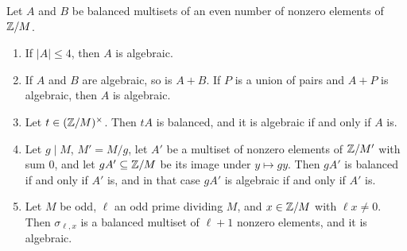 \begin{lemma}\label{lem:algtools}
Let $A$ and $B$ be balanced multisets of an even number of nonzero elements
of $\mathbb{Z}/M$.
\begin{enumerate}[label=\textup{(\alph*)}]
\item If $|A|\le4$, then $A$ is algebraic.
\item If $A$ and $B$ are algebraic, so is $A+B$. If $P$ is a union of pairs
and $A+P$ is algebraic, then $A$ is algebraic.
\item Let $t\in(\mathbb{Z}/M)^{\times}$. Then $tA$ is balanced, and it is algebraic
if and only if $A$ is.
\item Let $g\mid M$, $M'=M/g$, let $A'$ be a multiset of nonzero elements of
$\mathbb{Z}/M'$ with sum $0$, and let $gA'\subseteq\mathbb{Z}/M$ be its image under
$y\mapsto gy$. Then $gA'$ is balanced if and only if $A'$ is, and in that
case $gA'$ is algebraic if and only if $A'$ is.
\item Let $M$ be odd, $\ell$ an odd prime dividing $M$, and $x\in\mathbb{Z}/M$ with
$\ell x\ne0$. Then $\sigma_{\ell,x}$ is a balanced multiset of $\ell+1$
nonzero elements, and it is algebraic.
\end{enumerate}
\end{lemma}


